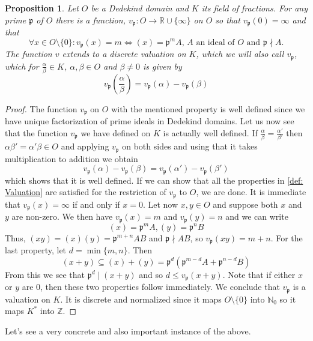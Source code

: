 \documentclass{article}
\newtheorem{proposition}{Proposition}[section]
\newcommand{\mfrak}[1]{\mathfrak{#1}}
\newcommand{\mbb}[1]{\mathbb{#1}}
\newcommand{\vp}{{v_{\mfrak p}}}
\numberwithin{equation}{section}
\begin{document}
\begin{proposition} \label{prop: Valuations on Dedekin domains}
    Let $O$ be a Dedekind domain and $K$ its field of fractions. For any prime $\mfrak p$ of $O$ there is a function, $\vp : O \to \mbb R \cup \{\infty \}$ on $O$ so that $\vp(0) = \infty$ and that
    \begin{equation}\label{eq: valuation}
        \forall x \in O\setminus \{0 \}: \vp(x) = m \iff (x) = \mfrak p^m A \text{, $A$ an ideal of $O$ and $\mfrak p \nmid A$}.
    \end{equation}
    The function $v$ extends to a discrete valuation on $K$, which we will also call $\vp$, which for $\frac{\alpha}{\beta} \in K$, $\alpha,\beta \in O$ and $\beta \neq 0$ is given by %
    $$v_\mfrak{p}(\frac{\alpha}{\beta}) = v_\mfrak{p}(\alpha) - v_\mfrak{p}(\beta)$$
\end{proposition}

\begin{proof}
    The function $\vp$ on $O$ with the mentioned property is well defined since we have unique factorization of prime ideals in Dedekind domains. Let us now see that the function $\vp$ we have defined on $K$ is actually well defined. If $\frac{\alpha}{\beta} = \frac{\alpha'}{\beta'}$ then $\alpha\beta' = \alpha'\beta \in O$ and applying $\vp$ on both sides and using that it takes multiplication to addition we obtain
    $$\vp(\alpha) - \vp(\beta) = \vp(\alpha') - \vp(\beta')$$
    which shows that it is well defined. If we can show that all the properties in \cref{def: Valuation} are satisfied for the restriction of $\vp$ to $O$, we are done. It is immediate that $\vp(x) = \infty$ if and only if $x = 0$. Let now $x,y \in O$ and suppose both $x$ and $y$ are non-zero. We then have $\vp (x) = m$ and $\vp (y) = n$ and we can write
    $$(x) = \mfrak{p}^m A, (y) = \mfrak{p}^n B$$
    Thus, $(xy) = (x)(y) = \mfrak{p}^{m+n} AB$ and $\mfrak p \nmid AB$, so $\vp(xy) = m + n$. For the last property, let $d = \min\{m, n\}$. Then
    $$(x + y) \subseteq (x) + (y) = \mfrak p^d (\mfrak p^{m-d} A + \mfrak p^{n-d} B)$$
    From this we see that $\mfrak p^d \mid (x + y)$ and so $d \leq \vp (x+y)$.
    Note that if either $x$ or $y$ are 0, then these two properties follow immediately. We conclude that $\vp$ is a valuation on $K$. It is discrete and normalized since it maps $O \setminus \{0 \}$ into $\mbb N_0$ so it maps $K^*$ into $\mbb Z$. 
\end{proof}

Let's see a very concrete and also important instance of the above.
\end{document}
